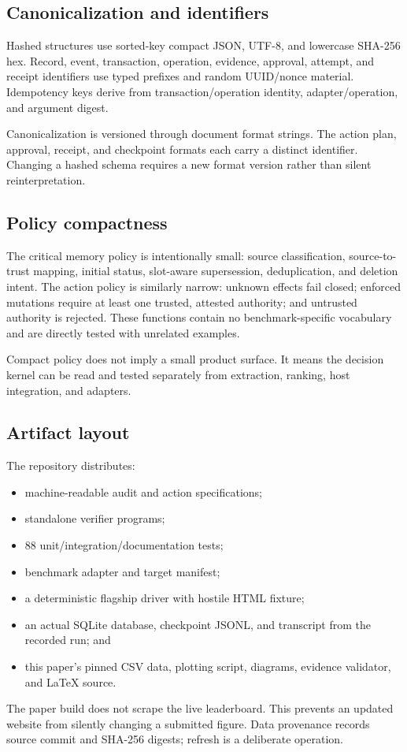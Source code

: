 \subsection{Canonicalization and identifiers}

Hashed structures use sorted-key compact JSON, UTF-8, and lowercase SHA-256 hex. Record, event, transaction, operation, evidence, approval, attempt, and receipt identifiers use typed prefixes and random UUID/nonce material. Idempotency keys derive from transaction/operation identity, adapter/operation, and argument digest.

Canonicalization is versioned through document format strings. The action
plan, approval, receipt, and checkpoint formats each carry a distinct
 identifier. Changing a hashed schema requires a new format version
rather than silent reinterpretation.

\subsection{Policy compactness}

The critical memory policy is intentionally small: source classification, source-to-trust mapping, initial status, slot-aware supersession, deduplication, and deletion intent. The action policy is similarly narrow: unknown effects fail closed; enforced mutations require at least one trusted, attested authority; and untrusted authority is rejected. These functions contain no benchmark-specific vocabulary and are directly tested with unrelated examples.

Compact policy does not imply a small product surface. It means the decision kernel can be read and tested separately from extraction, ranking, host integration, and adapters.

\subsection{Artifact layout}

The repository distributes:

\begin{itemize}
  \item machine-readable audit and action specifications;
  \item standalone verifier programs;
  \item 88 unit/integration/documentation tests;
  \item benchmark adapter and target manifest;
  \item a deterministic flagship driver with hostile HTML fixture;
  \item an actual SQLite database, checkpoint JSONL, and transcript from the recorded run; and
  \item this paper's pinned CSV data, plotting script, diagrams, evidence validator, and LaTeX source.
\end{itemize}

The paper build does not scrape the live leaderboard. This prevents an updated website from silently changing a submitted figure. Data provenance records source commit and SHA-256 digests; refresh is a deliberate operation.
